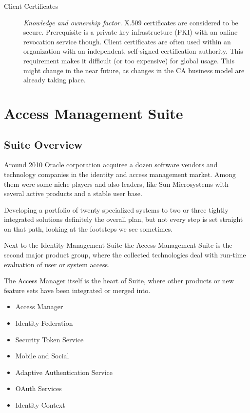 \documentclass[11pt]{report}
\begin{document}
\begin{description}
    \item[Client Certificates] \emph{Knowledge and ownership factor.}
        X.509 certificates are considered to be secure. Prerequisite is
        a private key infrastructure (PKI) with an online revocation
        service though. Client certificates are often used within an
        organization with an independent, self-signed certification
        authority. This requirement makes it difficult (or too
        expensive) for global usage. This might change in the near
        future, as changes in the CA business model are already taking
        place.

\end{description}


            


\chapter{Access Management Suite}

\section{Suite Overview}

Around 2010 Oracle corporation acquiree a dozen software vendors and
technology companies in the identity and access management market. Among
them were some niche players and also leaders, like Sun Microsystems
with several active products and a stable user base.

Developing a portfolio of twenty specialized systems to two or three
tightly integrated solutions definitely the overall plan, but not every
step is set straight on that path, looking at the footsteps we see
sometimes.

Next to the Identity Management Suite the Access Management Suite is the
second major product group, where the collected technologies deal with
run-time evaluation of user or system access.

The Access Manager itself is the heart of Suite, where other products or
new feature sets have been integrated or merged into.

\begin{itemize}
    \item Access Manager
    \item Identity Federation
    \item Security Token Service
    \item Mobile and Social
    \item Adaptive Authentication Service
    \item OAuth Services
    \item Identity Context
\end{itemize}
\end{document}
